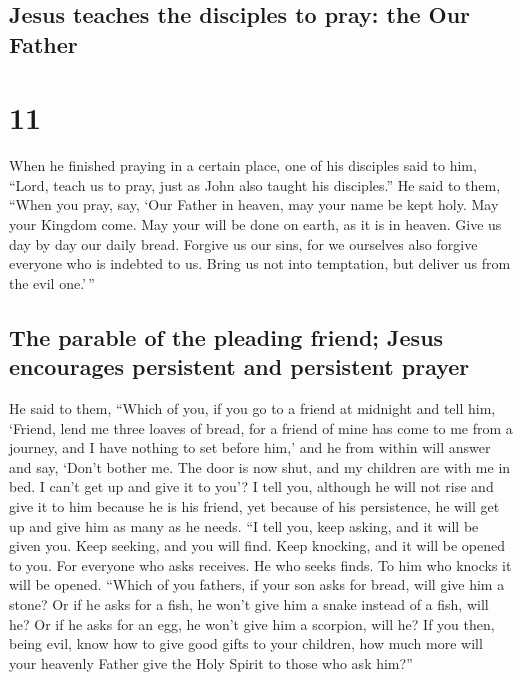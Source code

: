 \hypertarget{jesus-teaches-the-disciples-to-pray-the-our-father}{%
\subsection{Jesus teaches the disciples to pray: the Our
Father}\label{jesus-teaches-the-disciples-to-pray-the-our-father}}

\hypertarget{section-10}{%
\section{11}\label{section-10}}

 When he finished praying in a certain place, one of his
disciples said to him, ``Lord, teach us to pray, just as John also
taught his disciples.''  He said to them, ``When you pray,
say, `Our Father in heaven, may your name be kept holy. May your Kingdom
come. May your will be done on earth, as it is in heaven. 
Give us day by day our daily bread.  Forgive us our sins,
for we ourselves also forgive everyone who is indebted to us. Bring us
not into temptation, but deliver us from the evil one.'\,''

\hypertarget{the-parable-of-the-pleading-friend-jesus-encourages-persistent-and-persistent-prayer}{%
\subsection{The parable of the pleading friend; Jesus encourages
persistent and persistent
prayer}\label{the-parable-of-the-pleading-friend-jesus-encourages-persistent-and-persistent-prayer}}

 He said to them, ``Which of you, if you go to a friend at
midnight and tell him, `Friend, lend me three loaves of bread,
 for a friend of mine has come to me from a journey, and I
have nothing to set before him,'  and he from within will
answer and say, `Don't bother me. The door is now shut, and my children
are with me in bed. I can't get up and give it to you'?  I
tell you, although he will not rise and give it to him because he is his
friend, yet because of his persistence, he will get up and give him as
many as he needs.  ``I tell you, keep asking, and it will
be given you. Keep seeking, and you will find. Keep knocking, and it
will be opened to you.  For everyone who asks receives.
He who seeks finds. To him who knocks it will be opened. 
``Which of you fathers, if your son asks for bread, will give him a
stone? Or if he asks for a fish, he won't give him a snake instead of a
fish, will he?  Or if he asks for an egg, he won't give
him a scorpion, will he?  If you then, being evil, know
how to give good gifts to your children, how much more will your
heavenly Father give the Holy Spirit to those who ask him?''


